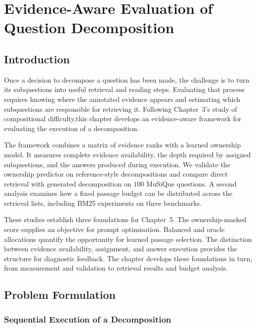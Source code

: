 \chapter{Evidence-Aware Evaluation of Question Decomposition}
\label{ch:evidence-aware}
\label{chap:empirical-studies}

\section*{Introduction}

Once a decision to decompose a question has been made, the challenge is to
turn its subquestions into useful retrieval and reading steps. Evaluating 
that process requires knowing where the annotated evidence appears and estimating 
which subquestions are responsible for retrieving it. Following Chapter~3's study 
of compositional difficulty,this chapter develops an evidence-aware framework for 
evaluating the execution of a decomposition.

The framework combines a matrix of evidence ranks with a learned ownership
model. It measures complete evidence availability, the depth required by
assigned subquestions, and the answers produced during execution. We validate
the ownership predictor on reference-style decompositions and compare direct
retrieval with generated decomposition on $100$ MuSiQue questions. A second
analysis examines how a fixed passage budget can be distributed across the
retrieval lists, including BM25 experiments on three benchmarks.

These studies establish three foundations for Chapter~5. The ownership-masked
score supplies an objective for prompt optimisation. Balanced and oracle
allocations quantify the opportunity for learned passage selection. The
distinction between evidence availability, assignment, and answer execution
provides the structure for diagnostic feedback. The chapter develops these
foundations in turn, from measurement and validation to retrieval results and
budget analysis.

\section{Problem Formulation}
\label{sec:ch4-problem}

\subsection{Sequential Execution of a Decomposition}

